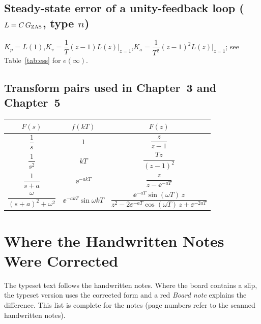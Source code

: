 \subsection*{Steady-state error of a unity-feedback loop ($L=C\,G_{\mathrm{ZAS}}$, type $n$)}
$K_p=L(1)$,\quad $K_v=\dfrac1T(z-1)L(z)\big|_{z=1}$,\quad $K_a=\dfrac1{T^{2}}(z-1)^{2}L(z)\big|_{z=1}$; see Table~\ref{tab:ess} for $e(\infty)$.

\subsection*{Transform pairs used in Chapter~3 and Chapter~5}
\begin{center}
\renewcommand{\arraystretch}{1.7}
\begin{tabular}{@{}c c c@{}}
$F(s)$ & $f(kT)$ & $F(z)$\\\hline
$\dfrac1s$ & $1$ & $\dfrac{z}{z-1}$\\
$\dfrac1{s^{2}}$ & $kT$ & $\dfrac{Tz}{(z-1)^{2}}$\\
$\dfrac1{s+a}$ & $\ee^{-akT}$ & $\dfrac{z}{z-\ee^{-aT}}$\\
$\dfrac{\omega}{(s+a)^{2}+\omega^{2}}$ & $\ee^{-akT}\sin\omega kT$ & $\dfrac{\ee^{-aT}\sin(\omega T)\,z}{z^{2}-2\ee^{-aT}\cos(\omega T)\,z+\ee^{-2aT}}$
\end{tabular}
\end{center}

\section{Where the Handwritten Notes Were Corrected}\label{app:slips}
The typeset text follows the handwritten notes. Where the board contains a slip, the typeset version uses
the corrected form and a red \emph{Board note} explains the difference. This list is complete for the notes
(page numbers refer to the scanned handwritten notes).

